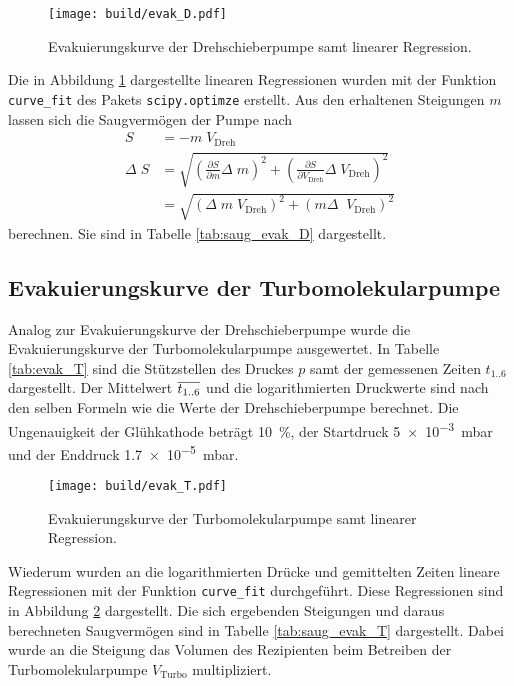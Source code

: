 \begin{figure}
  \centering
  \texttt{[image: build/evak\_D.pdf]}
  \caption{Evakuierungskurve der Drehschieberpumpe samt linearer Regression.}
  \label{fig:evak_D}
\end{figure}

Die in Abbildung \ref{fig:evak_D} dargestellte linearen Regressionen wurden
mit der Funktion \texttt{curve\_fit} des Pakets \texttt{scipy.optimze} \cite{scipy}
erstellt. Aus den erhaltenen Steigungen $m$ lassen sich die Saugvermögen der Pumpe
nach
\begin{align*}
    S &= - m \; V_\text{Dreh} \\
    \Delta \; S &=
    \sqrt{\left(\frac{\partial S}{\partial m} \Delta \; m\right)^2 +
    \left(\frac{\partial S}{\partial V_\text{Dreh}} \Delta \; V_\text{Dreh}\right)^2} \\
    &=
    \sqrt{\left(\Delta \; m \; V_\text{Dreh}\right)^2 +
    \left(m \Delta \; \; V_\text{Dreh}\right)^2}
\end{align*}
berechnen. Sie sind in Tabelle \ref{tab:saug_evak_D} dargestellt.


\FloatBarrier


\subsection{Evakuierungskurve der Turbomolekularpumpe}
\label{sec:AuswEvaT}

Analog zur Evakuierungskurve der Drehschieberpumpe wurde die Evakuierungskurve
der Turbomolekularpumpe ausgewertet. In Tabelle \ref{tab:evak_T} sind die
Stützstellen des Druckes $p$ samt der gemessenen Zeiten $t_\text{1..6}$
dargestellt. Der Mittelwert $\overline{t_\text{1..6}}$ und die logarithmierten
Druckwerte sind nach den selben Formeln wie die Werte der Drehschieberpumpe
berechnet. Die Ungenauigkeit der Glühkathode beträgt \SI{10}{\percent}, der
Startdruck \SI{5e-3}{\milli\bar} und der Enddruck
\SI{1.7e-5}{\milli\bar}.



\begin{figure}
  \centering
  \texttt{[image: build/evak\_T.pdf]}
  \caption{Evakuierungskurve der Turbomolekularpumpe samt linearer Regression.}
  \label{fig:evak_T}
\end{figure}

Wiederum wurden an die logarithmierten Drücke und gemittelten Zeiten
lineare Regressionen mit der Funktion \texttt{curve\_fit} durchgeführt.
Diese Regressionen sind in Abbildung \ref{fig:evak_T} dargestellt.
Die sich ergebenden Steigungen und daraus berechneten Saugvermögen sind in
Tabelle \ref{tab:saug_evak_T} dargestellt. Dabei wurde an die Steigung das
Volumen des Rezipienten beim Betreiben der Turbomolekularpumpe $V_\text{Turbo}$
multipliziert.

